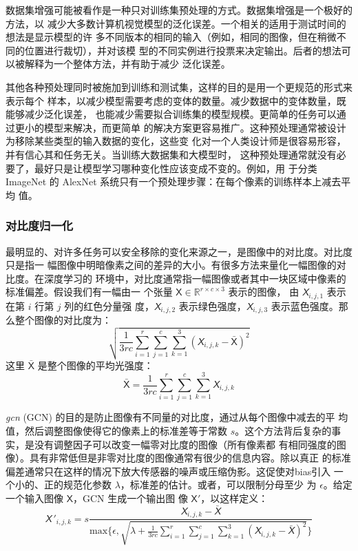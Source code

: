 数据集增强可能被看作是一种只对训练集预处理的方式。数据集增强是一个极好的方法，以
减少大多数计算机视觉模型的泛化误差。一个相关的适用于测试时间的想法是显示模型的许
多不同版本的相同的输入（例如，相同的图像，但在稍微不同的位置进行裁切），并对该模
型的不同实例进行投票来决定输出。后者的想法可以被解释为一个整体方法，并有助于减少
泛化误差。

其他各种预处理同时被施加到训练和测试集，这样的目的是用一个更规范的形式来表示每个
样本，以减少模型需要考虑的变体的数量。减少数据中的变体数量，既能够减少泛化误差，
也能减少需要拟合训练集的模型规模。更简单的任务可以通过更小的模型来解决，而更简单
的解决方案更容易推广。这种预处理通常被设计为移除某些类型的输入数据的变化，这些变
化对一个人类设计师是很容易形容，并有信心其和任务无关。当训练大数据集和大模型时，
这种预处理通常就没有必要了，最好只是让模型学习哪种变化性应该变成不变的。例如，用
于分类 ImageNet 的 AlexNet 系统只有一个预处理步骤：在每个像素的训练样本上减去平均
值\citep{Krizhevsky-2012}。

\subsubsection{对比度归一化}
\label{subsubsec:contrast_nomalization}

最明显的、对许多任务可以安全移除的变化来源之一，是图像中的对比度。对比度只是指一
幅图像中明暗像素之间的差异的大小。有很多方法来量化一幅图像的对比度。在深度学习的
环境中，对比度通常指一幅图像或者其中一块区域中像素的标准偏差。假设我们有一幅由一
个张量 $\mathsf{X} \in \mathbb{R}^{r \times c \times 3}$ 表示的图像，
由 $\mathsfit{X}_{i,j,1}$ 表示在第 $i$ 行第 $j$ 列的红色分量强
度，$\mathsfit{X}_{i,j,2}$ 表示绿色强度，$\mathsfit{X}_{i,j,3}$ 表示蓝色强度。那
么整个图像的对比度为：
\begin{equation}
\sqrt{\frac{1}{3rc}\displaystyle\sum_{i=1}^r\sum_{j=1}^c\sum_{k=1}^3(\mathsfit{X}_{i,j,k}
  - \bar{\pmb{\mathsf{X}}})^2}
\end{equation}
这里 $\bar{\pmb{\mathsf{X}}}$ 是整个图像的平均光强度：
\begin{equation}
  \bar{\pmb{\mathsf{X}}} = \frac{1}{3rc}\displaystyle\sum_{i=1}^r\sum_{j=1}^c\sum_{k=1}^3\mathsfit{X}_{i,j,k}
\end{equation}

\emph{\gls{gcn}} (GCN) 的目的是防止图像有不同量的对比度，通过从每个图像中减去的平
均值，然后调整图像使得它的像素上的标准差等于常数
$s$。这个方法背后复杂的事实，是没有调整因子可以改变一幅零对比度的图像（所有像素都
有相同强度的图像）。具有非常低但是非零对比度的图像通常有很少的信息内容。除以真正
的标准偏差通常只在这样的情况下放大传感器的噪声或压缩伪影。这促使对\gls*{bias}引入
一个小的、正的规范化参数 $\lambda$，标准差的估计。或者，可以限制分母至少
为 $\epsilon$。给定一个输入图像 $\pmb{\mathsf{X}}$，GCN 生成一个输出图
像 $\pmb{\mathsf{X}}'$，以这样定义：
\begin{equation}
  \mathsfit{X}\,'_{i,j,k} = s \frac{
    \mathsfit{X}_{i,j,k} - \bar{\mathsfit{X}}
  }{
    \mathrm{max}\bigg\{\epsilon, \sqrt{\lambda + \frac{1}{3rc}\sum_{i=1}^r\sum_{j=1}^c\sum_{k=1}^3(\mathsfit{X}_{i,j,k} - \bar{\mathsfit{X}})^2}\bigg\}
    }
\end{equation}


